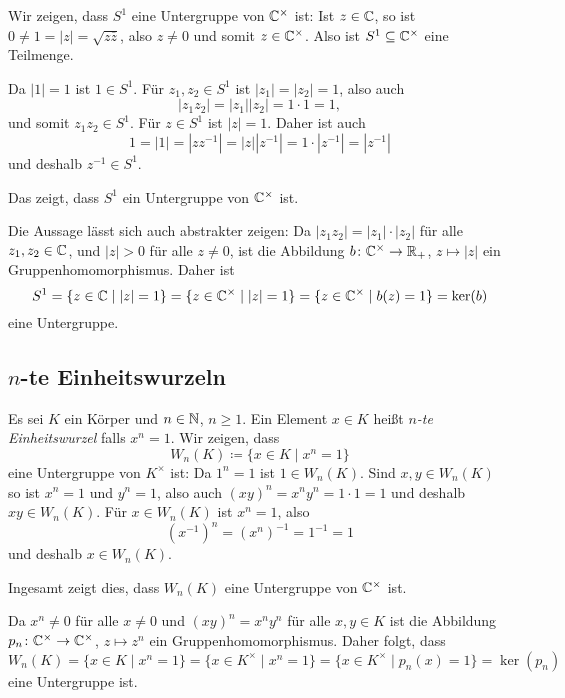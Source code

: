 Wir zeigen, dass $S^1$ eine Untergruppe von $\mathbb{C}^\times$ ist: Ist $z \in \mathbb{C}$, so ist $0 \neq 1 = |z| = \sqrt{z \overline{z}}$, also $z \neq 0$ und somit $z \in \mathbb{C}^\times$. Also ist $S^1 \subseteq \mathbb{C}^\times$ eine Teilmenge.

Da $|1| = 1$ ist $1 \in S^1$. Für $z_1, z_2 \in S^1$ ist $|z_1| = |z_2| = 1$, also auch
\[
 |z_1 z_2| = |z_1| |z_2| = 1 \cdot 1 = 1,
\]
und somit $z_1 z_2 \in S^1$. Für $z \in S^1$ ist $|z|= 1$. Daher ist auch
\[
 1 = |1| = |z z^{-1}| = |z| |z^{-1}| = 1 \cdot |z^{-1}| = |z^{-1}|
\]
und deshalb $z^{-1} \in S^1$.

Das zeigt, dass $S^1$ ein Untergruppe von $\mathbb{C}^\times$ ist.


\begin{bem}
 Die Aussage lässt sich auch abstrakter zeigen: Da $|z_1 z_2| = |z_1| \cdot |z_2|$ für alle $z_1, z_2 \in \mathbb{C}$, und $|z| > 0$ für alle $z \neq 0$, ist die Abbildung $b \colon \mathbb{C}^\times \to \mathbb{R}_+$, $z \mapsto |z|$ ein Gruppenhomomorphismus. Daher ist
 \[
  S^1
  = \{z \in \mathbb{C} \mid |z| = 1\}
  = \{z \in \mathbb{C}^\times \mid |z| = 1\}
  = \{z \in \mathbb{C}^\times \mid b(z) = 1\}
  = \ker(b)
 \]
 eine Untergruppe.
\end{bem}



\subsection{\texorpdfstring{$n$}{n}-te Einheitswurzeln}
Es sei $K$ ein Körper und $n \in \mathbb{N}$, $n \geq 1$. Ein Element $x \in K$ heißt \emph{$n$-te Einheitswurzel} falls $x^n = 1$. Wir zeigen, dass
\[
 W_n(K) \coloneqq \{x \in K \mid x^n = 1\}
\]
eine Untergruppe von $K^\times$ ist: Da $1^n = 1$ ist $1 \in W_n(K)$. Sind $x,y \in W_n(K)$ so ist $x^n = 1$ und $y^n = 1$, also auch $(xy)^n = x^n y^n = 1 \cdot 1 = 1$ und deshalb $xy \in W_n(K)$. Für $x \in W_n(K)$ ist $x^n = 1$, also
\[
 (x^{-1})^n = (x^n)^{-1} = 1^{-1} = 1
\]
und deshalb $x \in W_n(K)$.

Ingesamt zeigt dies, dass $W_n(K)$ eine Untergruppe von $\mathbb{C}^\times$ ist.

\begin{bem}
 Da $x^n \neq 0$ für alle $x \neq 0$ und $(xy)^n = x^n y^n$ für alle $x,y \in K$ ist die Abbildung $p_n \colon \mathbb{C}^\times \to \mathbb{C}^\times$, $z \mapsto z^n$ ein Gruppenhomomorphismus. Daher folgt, dass
 \[
  W_n(K)
  = \{x \in K \mid x^n = 1\}
  = \{x \in K^\times \mid x^n = 1\}
  = \{x \in K^\times \mid p_n(x) = 1\}
  = \ker(p_n)
 \]
 eine Untergruppe ist.
\end{bem}


